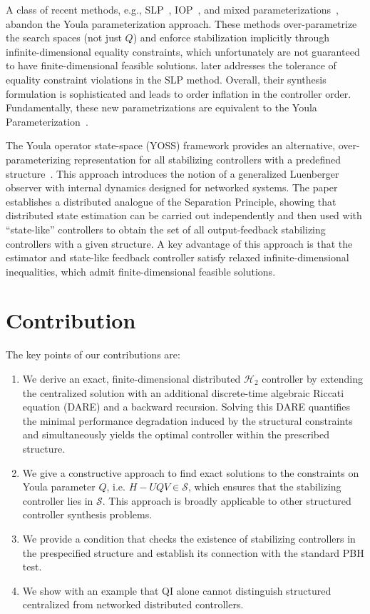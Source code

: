 A class of recent methods, e.g., SLP~\cite{SLSparametrization, wang2019SLS}, IOP~\cite{Furieri2019IOP}, and mixed parameterizations~\cite{Zheng2022SLP_IOP}, abandon the Youla parameterization approach. These methods over-parametrize the search spaces (not just $Q$) and enforce stabilization implicitly through infinite-dimensional equality constraints, which unfortunately are not guaranteed to have finite-dimensional feasible solutions. \cite{Matni2017SLStol} later addresses the tolerance of equality constraint violations in the SLP method. Overall, their synthesis formulation is sophisticated and leads to order inflation in the controller order. Fundamentally, these new parametrizations are equivalent to the Youla Parameterization~\cite{Zheng2021Equi_SLP_IOP, Tseng2021Equi_Par}.


The Youla operator state-space (YOSS) framework provides an alternative, over-parameterizing representation for all stabilizing controllers with a predefined structure~\cite{naghnaeian2019youla}. This approach introduces the notion of a generalized Luenberger observer with internal dynamics designed for networked systems. The paper establishes a distributed analogue of the Separation Principle, showing that distributed state estimation can be carried out independently and then used with “state-like” controllers to obtain the set of all output-feedback stabilizing controllers with a given structure. A key advantage of this approach is that the estimator and state-like feedback controller satisfy relaxed infinite-dimensional inequalities, which admit finite-dimensional feasible solutions.

\section{Contribution}
The key points of our contributions are:
\begin{enumerate}
    \item We derive an exact, finite-dimensional distributed \(\mathcal{H}_2\) controller by extending the centralized solution with an additional discrete-time algebraic Riccati equation (DARE) and a backward recursion. Solving this DARE quantifies the minimal performance degradation induced by the structural constraints and simultaneously yields the optimal controller within the prescribed structure.
    \item We give a constructive approach to find exact solutions to the constraints on Youla parameter \(Q\), i.e. \(H -U Q V \in \mathcal{S}\), which ensures that the stabilizing controller lies in \(\mathcal{S}\). This approach is broadly applicable to other structured controller synthesis problems.
    \item We provide a condition that checks the existence of stabilizing controllers in the prespecified structure and establish its connection with the standard PBH test. 
    \item We show with an example that QI alone cannot distinguish structured centralized from networked distributed controllers. 
\end{enumerate}


